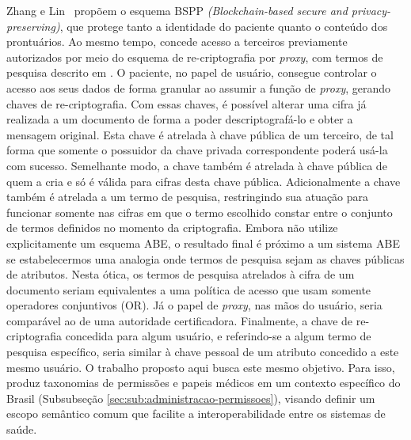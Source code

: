 \documentclass[a4paper,11pt]{article}
\begin{document}
Zhang e Lin~\cite{Zhang2018} propõem o esquema BSPP \emph{(Blockchain-based secure and privacy-preserving)}, que protege tanto a identidade do paciente quanto o conteúdo dos prontuários. Ao mesmo tempo, concede acesso a terceiros previamente autorizados por meio do esquema de re-criptografia por \emph{proxy}, com termos de pesquisa descrito em \cite{Wang2012}.
O paciente, no papel de usuário, consegue controlar o acesso aos seus dados de forma granular ao assumir a função de \emph{proxy}, gerando chaves de re-criptografia. Com essas chaves, é possível alterar uma cifra já realizada a um documento de forma a poder descriptografá-lo e obter a mensagem original.
Esta chave é atrelada à chave pública de um terceiro, de tal forma que somente o possuidor da chave privada correspondente poderá usá-la com sucesso.
Semelhante modo, a chave também é atrelada à chave pública de quem a cria e só é válida para cifras desta chave pública.
Adicionalmente a chave também é atrelada a um termo de pesquisa, restringindo sua atuação para funcionar somente nas cifras em que o termo escolhido constar entre o conjunto de termos definidos no momento da criptografia.
Embora não utilize explicitamente um esquema ABE, o resultado final é próximo a um sistema ABE se estabelecermos uma analogia onde termos de pesquisa sejam as chaves públicas de atributos.
Nesta ótica, os termos de pesquisa atrelados à cifra de um documento seriam equivalentes a uma política de acesso que usam somente operadores conjuntivos (OR). Já o papel de \emph{proxy}, nas mãos do usuário, seria comparável ao de uma autoridade certificadora. Finalmente, a chave de re-criptografia concedida para algum usuário, e referindo-se a algum termo de pesquisa específico, seria similar à chave pessoal de um atributo concedido a este mesmo usuário. O trabalho proposto aqui busca este mesmo objetivo. Para isso, produz taxonomias de permissões e papeis médicos em um contexto específico do Brasil (Subsubseção \ref{sec:sub:administracao-permissoes}), visando definir um escopo semântico comum que facilite a interoperabilidade entre os sistemas de saúde.

\end{document}
